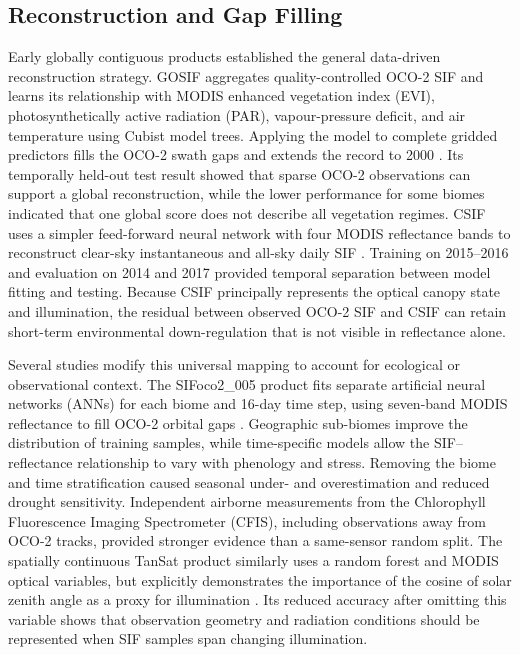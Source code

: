 \subsection{Reconstruction and Gap Filling}

Early globally contiguous products established the general data-driven reconstruction strategy. GOSIF aggregates quality-controlled OCO-2 SIF and learns its relationship with MODIS enhanced vegetation index (EVI), photosynthetically active radiation (PAR), vapour-pressure deficit, and air temperature using Cubist model trees. Applying the model to complete gridded predictors fills the OCO-2 swath gaps and extends the record to 2000 \cite{li2019global}. Its temporally held-out test result showed that sparse OCO-2 observations can support a global reconstruction, while the lower performance for some biomes indicated that one global score does not describe all vegetation regimes. CSIF uses a simpler feed-forward neural network with four MODIS reflectance bands to reconstruct clear-sky instantaneous and all-sky daily SIF \cite{zhang2018global}. Training on 2015--2016 and evaluation on 2014 and 2017 provided temporal separation between model fitting and testing. Because CSIF principally represents the optical canopy state and illumination, the residual between observed OCO-2 SIF and CSIF can retain short-term environmental down-regulation that is not visible in reflectance alone.

Several studies modify this universal mapping to account for ecological or observational context. The SIFoco2\_005 product fits separate artificial neural networks (ANNs) for each biome and 16-day time step, using seven-band MODIS reflectance to fill OCO-2 orbital gaps \cite{yu2019high}. Geographic sub-biomes improve the distribution of training samples, while time-specific models allow the SIF--reflectance relationship to vary with phenology and stress. Removing the biome and time stratification caused seasonal under- and overestimation and reduced drought sensitivity. Independent airborne measurements from the Chlorophyll Fluorescence Imaging Spectrometer (CFIS), including observations away from OCO-2 tracks, provided stronger evidence than a same-sensor random split. The spatially continuous TanSat product similarly uses a random forest and MODIS optical variables, but explicitly demonstrates the importance of the cosine of solar zenith angle as a proxy for illumination \cite{ma2020generation}. Its reduced accuracy after omitting this variable shows that observation geometry and radiation conditions should be represented when SIF samples span changing illumination.

